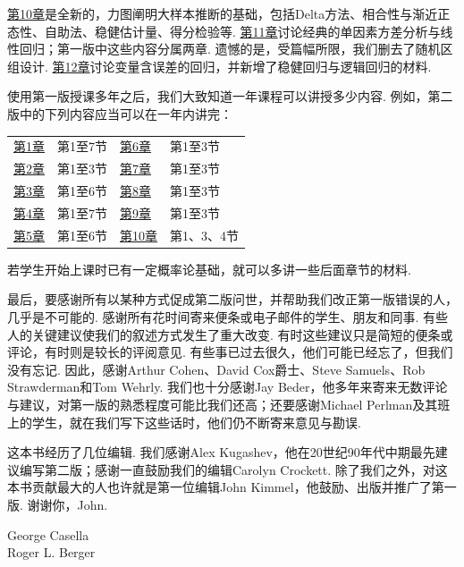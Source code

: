 \hyperref[sec:10]{第10章}是全新的，力图阐明大样本推断的基础，包括Delta方法、相合性与渐近正态性、自助法、稳健估计量、得分检验等. \hyperref[sec:11]{第11章}讨论经典的单因素方差分析与线性回归；第一版中这些内容分属两章. 遗憾的是，受篇幅所限，我们删去了随机区组设计. \hyperref[sec:12]{第12章}讨论变量含误差的回归，并新增了稳健回归与逻辑回归的材料.

使用第一版授课多年之后，我们大致知道一年课程可以讲授多少内容. 例如，第二版中的下列内容应当可以在一年内讲完：
\begin{center}\begin{tabular}{ll@{\qquad}ll}
\hyperref[sec:1]{第1章} & 第1至7节 & \hyperref[sec:6]{第6章} & 第1至3节\\
\hyperref[sec:2]{第2章} & 第1至3节 & \hyperref[sec:7]{第7章} & 第1至3节\\
\hyperref[sec:3]{第3章} & 第1至6节 & \hyperref[sec:8]{第8章} & 第1至3节\\
\hyperref[sec:4]{第4章} & 第1至7节 & \hyperref[sec:9]{第9章} & 第1至3节\\
\hyperref[sec:5]{第5章} & 第1至6节 & \hyperref[sec:10]{第10章} & 第1、3、4节
\end{tabular}\end{center}
若学生开始上课时已有一定概率论基础，就可以多讲一些后面章节的材料.

最后，要感谢所有以某种方式促成第二版问世，并帮助我们改正第一版错误的人，几乎是不可能的. 感谢所有花时间寄来便条或电子邮件的学生、朋友和同事. 有些人的关键建议使我们的叙述方式发生了重大改变. 有时这些建议只是简短的便条或评论，有时则是较长的评阅意见. 有些事已过去很久，他们可能已经忘了，但我们没有忘记. 因此，感谢Arthur Cohen、David Cox爵士、Steve Samuels、Rob Strawderman和Tom Wehrly. 我们也十分感谢Jay Beder，他多年来寄来无数评论与建议，对第一版的熟悉程度可能比我们还高；还要感谢Michael Perlman及其班上的学生，就在我们写下这些话时，他们仍不断寄来意见与勘误.

这本书经历了几位编辑. 我们感谢Alex Kugashev，他在20世纪90年代中期最先建议编写第二版；感谢一直鼓励我们的编辑Carolyn Crockett. 除了我们之外，对这本书贡献最大的人也许就是第一位编辑John Kimmel，他鼓励、出版并推广了第一版. 谢谢你，John.
\begin{flushright}George Casella\\Roger L. Berger\end{flushright}

